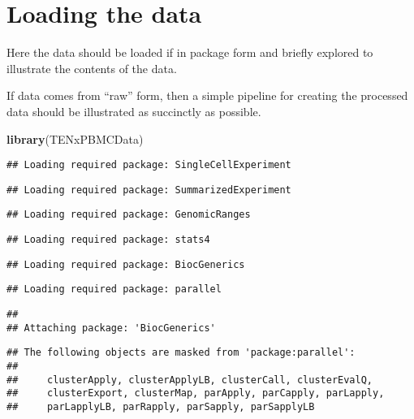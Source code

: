 \documentclass[]{book}
\newenvironment{Shaded}{\begin{snugshade}}{\end{snugshade}}
\newcommand{\KeywordTok}[1]{\textcolor[rgb]{0.13,0.29,0.53}{\textbf{#1}}}
\newcommand{\NormalTok}[1]{#1}
\begin{document}
\hypertarget{loading-the-data}{%
\section{Loading the data}\label{loading-the-data}}

Here the data should be loaded if in package form and briefly explored to illustrate the contents of the data.

If data comes from ``raw'' form, then a simple pipeline for creating the processed data should be illustrated as succinctly as possible.

\begin{Shaded}
\begin{Highlighting}[]
\KeywordTok{library}\NormalTok{(TENxPBMCData)}
\end{Highlighting}
\end{Shaded}

\begin{verbatim}
## Loading required package: SingleCellExperiment
\end{verbatim}

\begin{verbatim}
## Loading required package: SummarizedExperiment
\end{verbatim}

\begin{verbatim}
## Loading required package: GenomicRanges
\end{verbatim}

\begin{verbatim}
## Loading required package: stats4
\end{verbatim}

\begin{verbatim}
## Loading required package: BiocGenerics
\end{verbatim}

\begin{verbatim}
## Loading required package: parallel
\end{verbatim}

\begin{verbatim}
## 
## Attaching package: 'BiocGenerics'
\end{verbatim}

\begin{verbatim}
## The following objects are masked from 'package:parallel':
## 
##     clusterApply, clusterApplyLB, clusterCall, clusterEvalQ,
##     clusterExport, clusterMap, parApply, parCapply, parLapply,
##     parLapplyLB, parRapply, parSapply, parSapplyLB
\end{verbatim}
\end{document}
